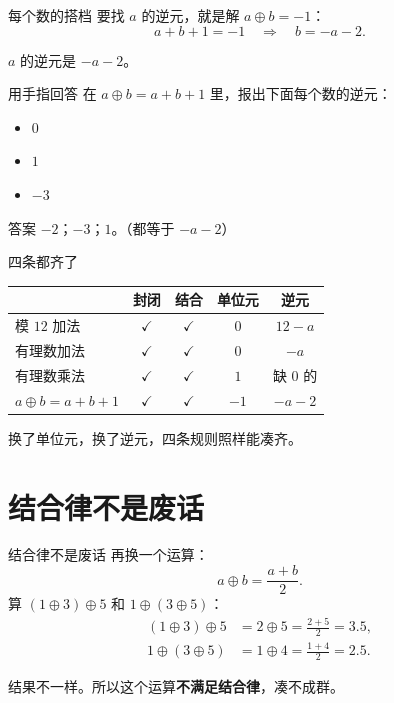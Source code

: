 \documentclass[10pt]{beamer}
\begin{document}
\begin{frame}{每个数的搭档}
  要找 \(a\) 的逆元，就是解 \(a\oplus b=-1\)：
  \[
    a+b+1=-1 \quad\Longrightarrow\quad b=-a-2 .
  \]
  \pause
  \begin{center}
    {\large \(a\) 的逆元是 \(-a-2\)。}
  \end{center}
\end{frame}

\begin{frame}{用手指回答}
  在 \(a\oplus b=a+b+1\) 里，报出下面每个数的逆元：
  \begin{itemize}
    \item \(0\)
    \item \(1\)
    \item \(-3\)
  \end{itemize}
  \pause
  \begin{block}{答案}
    \(-2\)；\quad \(-3\)；\quad \(1\)。\quad（都等于 \(-a-2\)）
  \end{block}
\end{frame}

\begin{frame}{四条都齐了}
  \begin{center}
  \begin{tabular}{@{}lcccc@{}}
    \toprule
     & 封闭 & 结合 & 单位元 & 逆元 \\
    \midrule
    模 \(12\) 加法 & \(\checkmark\) & \(\checkmark\) & \(0\) & \(12-a\) \\
    有理数加法 & \(\checkmark\) & \(\checkmark\) & \(0\) & \(-a\) \\
    有理数乘法 & \(\checkmark\) & \(\checkmark\) & \(1\) & 缺 \(0\) 的 \\
    \(a\oplus b=a+b+1\) & \(\checkmark\) & \(\checkmark\) & \(-1\) & \(-a-2\) \\
    \bottomrule
  \end{tabular}
  \end{center}
  \pause
  \begin{center}
    {\large 换了单位元，换了逆元，四条规则照样能凑齐。}
  \end{center}
\end{frame}

\section{结合律不是废话}

\begin{frame}{结合律不是废话}
  再换一个运算：
  \[
    a\oplus b=\frac{a+b}{2} .
  \]
  \pause
  算 \((1\oplus3)\oplus5\) 和 \(1\oplus(3\oplus5)\)：
  \pause
  \begin{align*}
    (1\oplus3)\oplus5 &= 2\oplus5 = \frac{2+5}{2} = 3.5,\\
    1\oplus(3\oplus5) &= 1\oplus4 = \frac{1+4}{2} = 2.5 .
  \end{align*}
  \pause
  \begin{att}
    结果不一样。所以这个运算\textbf{不满足结合律}，凑不成群。
  \end{att}
\end{frame}
\end{document}
